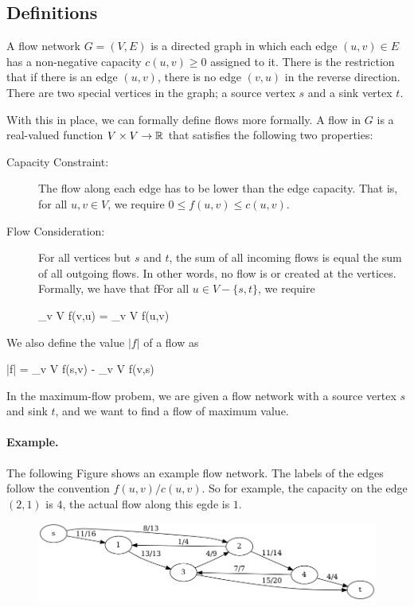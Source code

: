 
\subsection{Definitions}

A flow network $G = (V,E)$ is a directed graph in which each edge $(u,v) \in E$ has a non-negative capacity $c(u,v) \geq 0$ assigned to it. There is the restriction that if there is an edge $(u,v)$, there is no edge $(v,u)$ in the reverse direction. There are two special vertices in the graph; a source vertex $s$ and a sink vertex $t$.

With this in place, we can formally define flows more formally. A flow in $G$ is a real-valued function $V \times V \rightarrow \mathbb{R}$ that satisfies the following two properties:

\begin{description}
\item [Capacity Constraint:] The flow along each edge has to be lower than the edge capacity. That is, for all $u,v \in V$, we require $0 \leq f(u,v) \leq c(u,v)$.
\item [Flow Consideration:] For all vertices but $s$ and $t$, the sum of all incoming flows is equal the sum of all outgoing flows. In other words, no flow is or created at the vertices. Formally, we have that fFor all $u \in V - \{s,t\}$, we require

\bee
\sum_{v \in V} f(v,u) = \sum_{v \in V} f(u,v)
\eee

\end{description}

We also define the value $|f|$ of a flow as

\bee
|f| = \sum_{v \in V} f(s,v) - \sum_{v \in V} f(v,s)
\eee

In the maximum-flow probem, we are given a flow network with a source vertex $s$ and sink $t$, and we want to find a flow of maximum value.

\paragraph{Example.} The following Figure shows an example flow network. The labels of the edges follow the convention $f(u,v)/c(u,v)$. So for example, the capacity on the edge $(2,1)$ is $4$, the actual flow along this egde is $1$. 

\begin{figure}[H]
\centering
\includegraphics[scale=0.5]{images/max_flow_01.png}
\end{figure}


